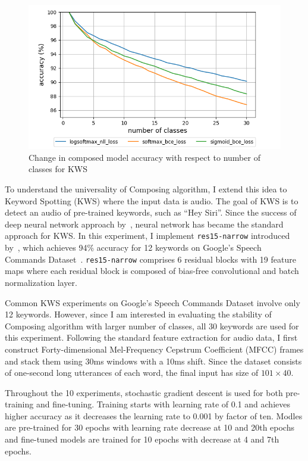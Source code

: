 \documentclass{article}
\begin{document}
\begin{figure}[t]
    \centering
    \includegraphics[scale=0.4,trim={0mm 0mm 0mm 0mm},clip]{kws.png}
    \caption{Change in composed model accuracy with respect to number of classes for KWS}
    \label{figure:composed_kws}
\end{figure}


To understand the universality of Composing algorithm, I extend this idea to Keyword Spotting (KWS) where the input data is audio. The goal of KWS is to detect an audio of pre-trained keywords, such as “Hey Siri”. Since the success of deep neural network approach by~\cite{chen2014small}, neural network has became the standard approach for KWS. In this experiment, I implement \texttt{res15-narrow} introduced by~\cite{tang2018deep}, which achieves 94\% accuracy for 12 keywords on Google’s Speech Commands Dataset~\cite{speechcommandsdataset}. \texttt{res15-narrow} comprises 6 residual blocks with 19 feature maps where each residual block is composed of bias-free convolutional and batch normalization layer.

Common KWS experiments on Google’s Speech Commands Dataset involve only 12 keywords. However, since I am interested in evaluating the stability of Composing algorithm with larger number of classes, all 30 keywords are used for this experiment. Following the standard feature extraction for audio data, I first construct Forty-dimensional Mel-Frequency Cepstrum Coefficient (MFCC) frames and stack them using 30ms windows with a 10ms shift. Since the dataset consists of one-second long utterances of each word, the final input has size of $101\times40$.

Throughout the 10 experiments, stochastic gradient descent is used for both pre-training and fine-tuning. Training starts with learning rate of 0.1 and achieves higher accuracy as it decreases the learning rate to 0.001 by factor of ten. Modles are pre-trained for 30 epochs with learning rate decrease at 10 and 20th epochs and fine-tuned models are trained for 10 epochs with decrease at 4 and 7th epochs.
\end{document}
